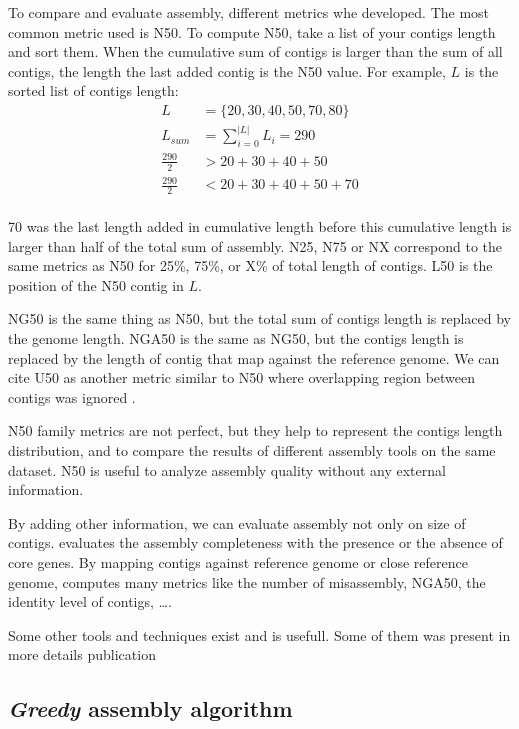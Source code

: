 \documentclass[./main.tex]{subfiles}
\begin{document}
To compare and evaluate assembly, different metrics whe developed. The most common metric used is N50.
To compute N50, take a list of your contigs length and sort them. When the cumulative sum of contigs is larger than the sum of all contigs, the length the last added contig is the N50 value. For example, $L$ is the sorted list of contigs length: 
\begin{equation}
\begin{aligned}
L &= \{20, 30, 40, 50, 70, 80\} \\
L_{sum} &= \sum\limits_{i=0}^{|L|} L_i = 290 \\
\frac{290}{2} &> 20 + 30 + 40 + 50 \\
\frac{290}{2} &< 20 + 30 + 40 + 50 + 70\\
\end{aligned}
\end{equation}

70 was the last length added in cumulative length before this cumulative length is larger than half of the total sum of assembly. N25, N75 or NX correspond to the same metrics as N50 for 25\%, 75\%, or X\% of total length of contigs. L50 is the position of the N50 contig in $L$.

NG50 is the same thing as N50, but the total sum of contigs length is replaced by the genome length. NGA50 is the same as NG50, but the contigs length is replaced by the length of contig that map against the reference genome. We can cite U50 as another metric similar to N50 where overlapping region between contigs was ignored \cite{U50}.

N50 family metrics are not perfect, but they help to represent the contigs length distribution, and to compare the results of different assembly tools on the same dataset. N50 is useful to analyze assembly quality without any external information.

By adding other information, we can evaluate assembly not only on size of contigs. \cite{busco} evaluates the assembly completeness with the presence or the absence of core genes. By mapping contigs against reference genome or close reference genome, \cite{quast} computes many metrics like the number of misassembly, NGA50, the identity level of contigs, …. 

Some other tools and techniques exist and is usefull. Some of them was present in more details publication \cite{seq_assembly_demystified}

\subsection{\textit{Greedy} assembly algorithm}
\end{document}

